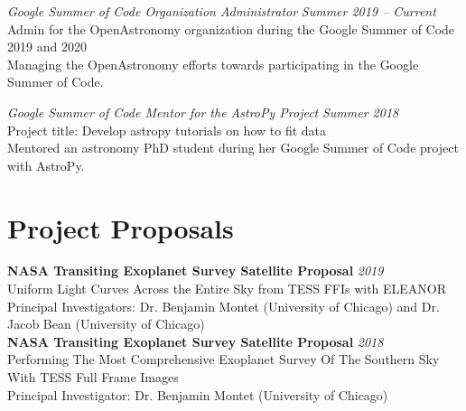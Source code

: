 \documentclass[10pt]{article}
\begin{document}
\begin{titlepage}
\emph{Google Summer of Code Organization Administrator} \hfill \textit{Summer 2019 -- Current}
\\Admin for the OpenAstronomy organization during the Google Summer of Code 2019 and 2020
\\ {\small Managing the OpenAstronomy efforts towards participating in the Google Summer of Code.}
\vspace{.5cm}

\emph{Google Summer of Code Mentor for the AstroPy Project} \hfill \textit{Summer 2018}
\\Project title: Develop astropy tutorials on how to fit data
\\ {\small Mentored an astronomy PhD student during her Google Summer of Code project with AstroPy.}


\section*{Project Proposals}
    \textbf{NASA Transiting Exoplanet Survey Satellite Proposal}
    \hfill \textit{2019}\\
    Uniform Light Curves Across the Entire Sky from TESS FFIs with ELEANOR\\
    {\small Principal Investigators: Dr. Benjamin Montet (University of Chicago) and Dr. Jacob Bean (University of Chicago)}\\

    \textbf{NASA Transiting Exoplanet Survey Satellite Proposal}
    \hfill \textit{2018}\\
    Performing The Most Comprehensive Exoplanet Survey Of The Southern Sky With TESS Full Frame Images\\
    {\small Principal Investigator: Dr. Benjamin Montet (University of Chicago)}


\end{titlepage}
\end{document}
